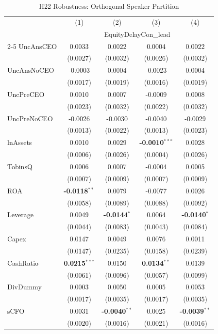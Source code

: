 \documentclass[11pt,a4paper]{article}
\begin{document}
\begin{table}[htbp]
\centering
\caption{H22 Robustness: Orthogonal Speaker Partition}
\label{tab:h22_robust}
\scriptsize
\begin{tabular}{lcccc}
\toprule
 & (1) & (2) & (3) & (4) \\
 & \multicolumn{4}{c}{EquityDelayCon\_lead} \\
\cmidrule(lr){2-5}
\midrule
UncAnsCEO & 0.0033 & 0.0022 & 0.0004 & 0.0022 \\
 & (0.0027) & (0.0032) & (0.0026) & (0.0032) \\
UncAnsNoCEO & -0.0003 & 0.0004 & -0.0023 & 0.0004 \\
 & (0.0017) & (0.0019) & (0.0016) & (0.0019) \\
UncPreCEO & 0.0010 & 0.0007 & -0.0009 & 0.0008 \\
 & (0.0023) & (0.0032) & (0.0022) & (0.0032) \\
UncPreNoCEO & -0.0026 & -0.0030 & -0.0040 & -0.0029 \\
 & (0.0013) & (0.0022) & (0.0013) & (0.0023) \\
\midrule
lnAssets & 0.0010 & 0.0029 & \textbf{-0.0010}$^{***}$ & 0.0028 \\
 & (0.0006) & (0.0026) & (0.0004) & (0.0026) \\
TobinsQ & 0.0006 & 0.0007 & -0.0004 & 0.0005 \\
 & (0.0007) & (0.0009) & (0.0007) & (0.0009) \\
ROA & \textbf{-0.0118}$^{**}$ & 0.0079 & -0.0077 & 0.0026 \\
 & (0.0058) & (0.0089) & (0.0088) & (0.0092) \\
Leverage & 0.0049 & \textbf{-0.0144}$^{*}$ & 0.0064 & \textbf{-0.0140}$^{*}$ \\
 & (0.0044) & (0.0083) & (0.0043) & (0.0084) \\
Capex & 0.0147 & 0.0049 & 0.0076 & 0.0011 \\
 & (0.0147) & (0.0235) & (0.0158) & (0.0239) \\
CashRatio & \textbf{0.0215}$^{***}$ & 0.0150 & \textbf{0.0134}$^{**}$ & 0.0139 \\
 & (0.0061) & (0.0096) & (0.0057) & (0.0099) \\
DivDummy & 0.0003 & 0.0050 & 0.0005 & 0.0053 \\
 & (0.0017) & (0.0035) & (0.0017) & (0.0035) \\
sCFO & 0.0031 & \textbf{-0.0040}$^{**}$ & 0.0025 & \textbf{-0.0039}$^{**}$ \\
 & (0.0020) & (0.0016) & (0.0021) & (0.0016) \\

\end{tabular}
\end{table}
\end{document}
